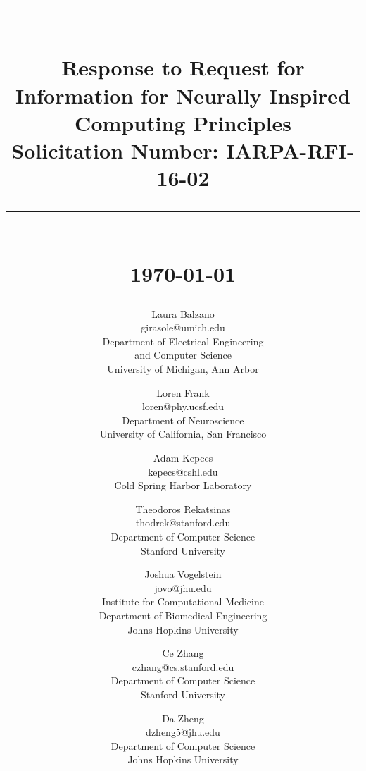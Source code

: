 \documentclass[12pt]{report}
\newcommand{\HRule}[1]{\rule{\linewidth}{#1}}
\begin{document}
\title{
\HRule{2pt} \\
\LARGE \textbf{Response to Request for Information for Neurally Inspired Computing Principles} \\
Solicitation Number: IARPA-RFI-16-02
\HRule{2pt} \\ [0.5cm]
\normalsize \today \vspace*{5\baselineskip}}

\date{}

\author{
{Laura Balzano}		\\
girasole@umich.edu	\\
Department of Electrical Engineering\\
and Computer Science	\\
University of Michigan, Ann Arbor
\and
{Loren Frank}			\\
loren@phy.ucsf.edu		\\
Department of Neuroscience	\\
University of California, San Francisco
\and
{Adam Kepecs}			\\
kepecs@cshl.edu		\\
Cold Spring Harbor Laboratory
\and
{Theodoros Rekatsinas}				\\
thodrek@stanford.edu				\\
Department of Computer Science		\\
Stanford University
\and
{Joshua Vogelstein} 	\\
jovo@jhu.edu		\\
Institute for Computational Medicine 	\\
Department of Biomedical Engineering 	\\
Johns Hopkins University
\and
{Ce Zhang}	\\
czhang@cs.stanford.edu				\\
Department of Computer Science		\\
Stanford University
\and
{Da Zheng}	\\
dzheng5@jhu.edu		\\
Department of Computer Science \\
Johns Hopkins University
} %

\maketitle
\newpage

\sectionfont{\scshape}
\end{document}
